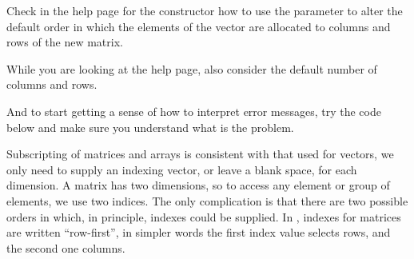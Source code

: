 \documentclass[krantz2]{krantz}\usepackage{knitr}%
\begin{document}
\begin{playground}
Check in the help page for the  constructor how to use the  parameter to alter the default order in which the elements of the vector are allocated to columns and rows of the new matrix.

\begin{knitrout}\footnotesize
{}\color{fgcolor}\begin{kframe}
\begin{alltt}
\end{alltt}
\end{kframe}
\end{knitrout}

While you are looking at the help page, also consider the default number of columns and rows.

\begin{knitrout}\footnotesize
{}\color{fgcolor}\begin{kframe}
\begin{alltt}
\hlstd{(}\hlopt{:}\hlstd{)}
\end{alltt}
\end{kframe}
\end{knitrout}

And to start getting a sense of how to interpret error messages, try the code below and make sure you understand what is the problem.

\begin{knitrout}\footnotesize
{}\color{fgcolor}\begin{kframe}
\begin{alltt}
\hlstd{(}\hlopt{:}\hlstd{,}  \hlstd{=} \hlstd{)}
\end{alltt}
\end{kframe}
\end{knitrout}

\end{playground}

Subscripting of matrices and arrays is consistent with that used for vectors, we only need to supply an indexing vector, or leave a blank space, for each dimension. A matrix has two dimensions, so to access any element or group of elements, we use two indices. The only complication is that there are two possible orders in which, in principle, indexes could be supplied. In \Rlang, indexes for matrices are written ``row-first'', in simpler words the first index value selects rows, and the second one columns.
\end{document}
